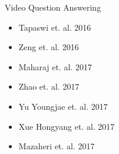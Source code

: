 \begin{frame}
\begin{columns}
\begin{column}{0.4\textwidth}
\begin{overlayarea}{\textwidth}{\textheight}
              \begin{block}{Video Question Answering
                }
                \begin{itemize}
                    \item Tapaswi et. al. 2016 \cite{DBLP:conf/cvpr/TapaswiZSTUF16}
                    \item Zeng et. al. 2016 \cite{DBLP:journals/corr/ZengCCLNS16}
                    \item Maharaj et. al. 2017 \cite{DBLP:conf/cvpr/MaharajBRCP17}
                    \item Zhao et. al. 2017 \cite{DBLP:conf/ijcai/ZhaoYCHZ17}
                    \item Yu Youngjae et. al. 2017 \cite{DBLP:conf/cvpr/YuKCK17}
                    \item Xue Hongyang et. al. 2017 \cite{DBLP:journals/corr/XueZC17}
                    \item Mazaheri et. al. 2017 \cite{DBLP:journals/corr/MazaheriZS16}
                    \end{itemize}
              \end{block}
\end{overlayarea}
\end{column}

\end{columns}
\end{frame}

